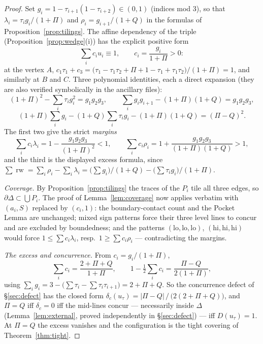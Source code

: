\documentclass{aims}
\numberwithin{equation}{section}
\theoremstyle{plain}
\theoremstyle{definition}
\theoremstyle{remark}
\newcommand{\rw}{\operatorname{rw}}
\begin{document}
\begin{proof}
Set $g_i=1-\tau_{i+1}(1-\tau_{i+2})\in(0,1)$ (indices mod $3$), so that
$\lambda_i=\tau_ig_i/(1+\Pi)$ and $\rho_i=g_{i+1}/(1+Q)$ in the formulas of
Proposition~\ref{prop:tilings}. The affine dependency of the triple
(Proposition~\ref{prop:wedge}(i)) has the explicit positive form
\[
\sum_ic_iu_i\equiv1,\qquad c_i=\frac{g_i}{1+\Pi}>0 :
\]
at the vertex $A$, $c_1\tau_1+c_3
=\bigl(\tau_1-\tau_1\tau_2+\Pi+1-\tau_1+\tau_1\tau_2\bigr)/(1+\Pi)=1$, and
similarly at $B$ and $C$. Three polynomial identities, each a direct
expansion (they are also verified symbolically in the ancillary files):
\[
(1+\Pi)^2-\sum_i\tau_ig_i^2=g_1g_2g_3,\qquad
\sum_ig_ig_{i+1}-(1+\Pi)(1+Q)=g_1g_2g_3,
\]
\[
(1+\Pi)\sum_ig_i-(1+Q)\sum_i\tau_ig_i-(1+\Pi)(1+Q)=(\Pi-Q)^2 .
\]
The first two give the strict \emph{margins}
\[
\sum_ic_i\lambda_i=1-\frac{g_1g_2g_3}{(1+\Pi)^2}<1,\qquad
\sum_ic_i\rho_i=1+\frac{g_1g_2g_3}{(1+\Pi)(1+Q)}>1,
\]
and the third is the displayed excess formula, since
$\sum\rw=\sum_i\rho_i-\sum_i\lambda_i
=\bigl(\sum g_i\bigr)/(1+Q)-\bigl(\sum\tau_ig_i\bigr)/(1+\Pi)$.

\emph{Coverage.} By Proposition~\ref{prop:tilings} the traces of the $P_i$
tile all three edges, so $\partial\Delta\subset\bigcup P_i$. The proof of
Lemma~\ref{lem:coverage} now applies verbatim with $(a_i,S)$ replaced by
$(c_i,1)$: the boundary-contact count and the Pocket Lemma are unchanged;
mixed sign patterns force their three level lines to concur and are excluded
by boundedness; and the patterns
$(\mathrm{lo},\mathrm{lo},\mathrm{lo})$, $(\mathrm{hi},\mathrm{hi},\mathrm{hi})$
would force $1\le\sum c_i\lambda_i$, resp.\ $1\ge\sum c_i\rho_i$ ---
contradicting the margins.

\emph{The excess and concurrence.} From $c_i=g_i/(1+\Pi)$,
\[
\textstyle\sum_ic_i=\frac{2+\Pi+Q}{1+\Pi},\qquad
1-\tfrac12\sum_ic_i=\frac{\Pi-Q}{2(1+\Pi)},
\]
using $\sum_ig_i=3-\bigl(\sum\tau_i-\sum\tau_i\tau_{i+1}\bigr)=2+\Pi+Q$. So
the concurrence defect of \S\ref{sec:defect} has the closed form
$\delta_c(u_\tau)=|\Pi-Q|\,/\,\bigl(2(2+\Pi+Q)\bigr)$, and $\Pi=Q$ iff
$\delta_c=0$ iff the mid-lines concur --- necessarily inside $\Delta$
(Lemma~\ref{lem:external}, proved independently in \S\ref{sec:defect}) ---
iff $D(u_\tau)=1$. At $\Pi=Q$ the excess vanishes and the configuration is
the tight covering of Theorem~\ref{thm:tight}.
\end{proof}
\end{document}
